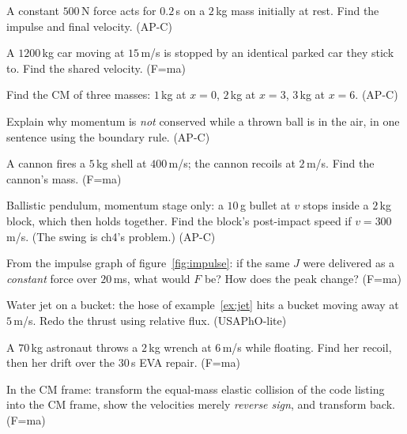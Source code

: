\begin{exercise}[easy]
A constant $500$\,N force acts for $0.2$\,s on a $2$\,kg mass initially at
rest. Find the impulse and final velocity. (AP-C)
\end{exercise}
\begin{exercise}[easy]
A $1200$\,kg car moving at $15$\,m/s is stopped by an identical parked car
they stick to. Find the shared velocity. (F=ma)
\end{exercise}
\begin{exercise}[easy]
Find the CM of three masses: $1$\,kg at $x=0$, $2$\,kg at $x=3$,
$3$\,kg at $x=6$. (AP-C)
\end{exercise}
\begin{exercise}[easy]
Explain why momentum is \emph{not} conserved while a thrown ball is in the
air, in one sentence using the boundary rule. (AP-C)
\end{exercise}
\begin{exercise}[easy]
A cannon fires a $5$\,kg shell at $400$\,m/s; the cannon recoils at
$2$\,m/s. Find the cannon's mass. (F=ma)
\end{exercise}
\begin{exercise}[medium]
Ballistic pendulum, momentum stage only: a $10$\,g bullet at
$v$ stops inside a $2$\,kg block, which then holds together. Find the
block's post-impact speed if $v=300$\,m/s. (The swing is ch4's problem.)
(AP-C)
\end{exercise}
\begin{exercise}[medium]
From the impulse graph of figure~\ref{fig:impulse}: if the same $J$ were
delivered as a \emph{constant} force over $20$\,ms, what would $F$ be? How
does the peak change? (F=ma)
\end{exercise}
\begin{exercise}[medium]
Water jet on a bucket: the hose of example~\ref{ex:jet} hits a bucket
moving away at $5$\,m/s. Redo the thrust using relative flux. (USAPhO-lite)
\end{exercise}
\begin{exercise}[medium]
A $70$\,kg astronaut throws a $2$\,kg wrench at $6$\,m/s while floating.
Find her recoil, then her drift over the $30$\,s EVA repair. (F=ma)
\end{exercise}
\begin{exercise}[medium]
In the CM frame: transform the equal-mass elastic collision of the code
listing into the CM frame, show the velocities merely \emph{reverse sign},
and transform back. (F=ma)
\end{exercise}
